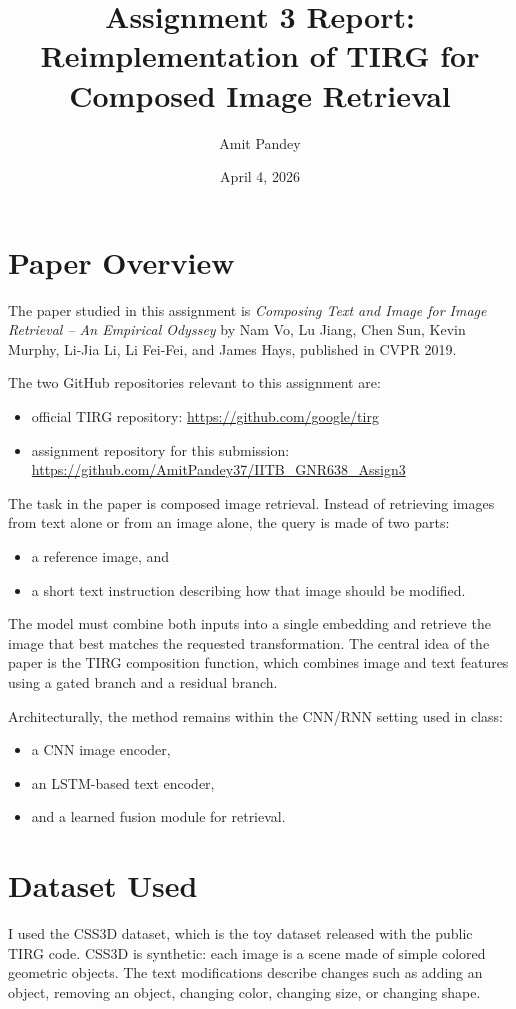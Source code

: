 \documentclass[11pt]{article}
\title{Assignment 3 Report:\\Reimplementation of TIRG for Composed Image Retrieval}
\author{Amit Pandey}
\date{April 4, 2026}
\begin{document}
\maketitle

\section{Paper Overview}
The paper studied in this assignment is \textit{Composing Text and Image for Image Retrieval -- An Empirical Odyssey} by Nam Vo, Lu Jiang, Chen Sun, Kevin Murphy, Li-Jia Li, Li Fei-Fei, and James Hays, published in CVPR 2019.

The two GitHub repositories relevant to this assignment are:
\begin{itemize}[leftmargin=*]
  \item official TIRG repository: \url{https://github.com/google/tirg}
  \item assignment repository for this submission: \url{https://github.com/AmitPandey37/IITB_GNR638_Assign3}
\end{itemize}

The task in the paper is composed image retrieval. Instead of retrieving images from text alone or from an image alone, the query is made of two parts:
\begin{itemize}[leftmargin=*]
  \item a reference image, and
  \item a short text instruction describing how that image should be modified.
\end{itemize}

The model must combine both inputs into a single embedding and retrieve the image that best matches the requested transformation. The central idea of the paper is the TIRG composition function, which combines image and text features using a gated branch and a residual branch.

Architecturally, the method remains within the CNN/RNN setting used in class:
\begin{itemize}[leftmargin=*]
  \item a CNN image encoder,
  \item an LSTM-based text encoder,
  \item and a learned fusion module for retrieval.
\end{itemize}

\section{Dataset Used}
I used the CSS3D dataset, which is the toy dataset released with the public TIRG code. CSS3D is synthetic: each image is a scene made of simple colored geometric objects. The text modifications describe changes such as adding an object, removing an object, changing color, changing size, or changing shape.
\end{document}
